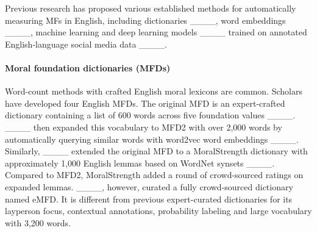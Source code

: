 

Previous research has proposed various established methods for automatically measuring MFs in English, including dictionaries ____, word embeddings ____, machine learning and deep learning models ____ trained on annotated English-language social media data ____. %

\paragraph{Moral foundation dictionaries (MFDs)} 
Word-count methods with crafted English moral lexicons are common. Scholars have developed four English MFDs. The original MFD is an expert-crafted dictionary containing a list of 600 words across five foundation values ____. ____ then expanded this vocabulary to MFD2 with over 2,000 words by automatically querying similar words with word2vec word embeddings ____. Similarly, ____ extended the original MFD to a MoralStrength dictionary with approximately 1,000 English lemmas based on WordNet synsets ____. Compared to MFD2, MoralStrength added a round of crowd-sourced ratings on expanded lemmas. ____, however, curated a fully crowd-sourced dictionary named eMFD. It is different from previous expert-curated dictionaries for its layperson focus, contextual annotations, probability labeling and large vocabulary with 3,200 words. 


